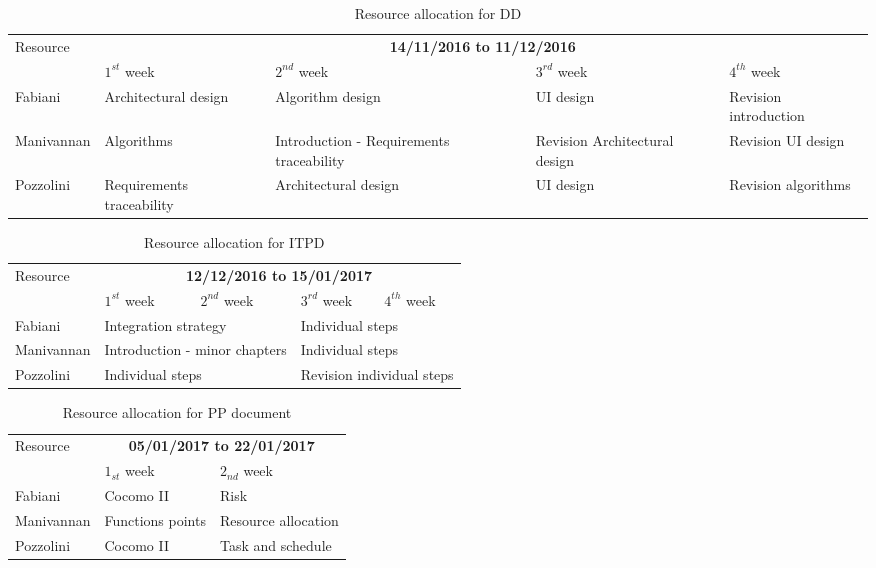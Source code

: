 \begin{table}[H]
		\begin{tabular}{|l|p{2.35cm}|p{2.35cm}|p{2.35cm}|p{2.35cm}|}
			\hline
			\multirow{2}{*}{Resource} & \multicolumn{4}{c|}{\textbf{14/11/2016 to 11/12/2016}} \\
			\cline{2-5}
			& $1^{st}$ week & $2^{nd}$ week & $3^{rd} $ week & $4^{th}$ week \\
			\hline
			Fabiani & Architectural design & Algorithm design & UI design & Revision introduction \\
			Manivannan & Algorithms & Introduction - Requirements traceability & Revision Architectural design & Revision UI design \\
			Pozzolini & Requirements traceability & Architectural design & UI design & Revision algorithms \\
			\hline
		\end{tabular}
	\caption{Resource allocation for DD}
	\label{tab:dd-alloc}
\end{table}

\begin{table}[H]
	\centering
	\begin{tabular}{|l|p{2.35cm}|p{2.35cm}|p{2.35cm}|p{2.35cm}|}
		\hline
		\multirow{2}{*}{Resource} & \multicolumn{4}{c|}{\textbf{12/12/2016 to 15/01/2017}} \\
		\cline{2-5}
		& $1^{st}$ week & $2^{nd}$ week & $3^{rd} $ week & $4^{th}$ week \\
		\hline
		Fabiani & \multicolumn{2}{l|}{Integration strategy} & \multicolumn{2}{l|}{Individual steps} \\
		Manivannan & \multicolumn{2}{l|}{Introduction - minor chapters} & \multicolumn{2}{l|}{Individual steps} \\
		Pozzolini & \multicolumn{2}{l|}{Individual steps} & \multicolumn{2}{l|}{Revision individual steps} \\
		\hline
	\end{tabular}
	\caption{Resource allocation for ITPD}
	\label{tab:itpd-alloc}
\end{table}

\begin{table}[H]
	\centering
	\begin{tabular}{|l|l|l|}
		\hline
		\multirow{2}{*}{Resource} & \multicolumn{2}{c|}{\textbf{05/01/2017 to 22/01/2017}} \\
		\cline{2-3}
		& $1_{st}$ week & $2_{nd}$ week \\
		\hline
		Fabiani & Cocomo II    & Risk      \\
		Manivannan & Functions points     & Resource allocation    \\
		Pozzolini & Cocomo II    & Task and schedule    \\
		\hline
	\end{tabular}
	\caption{Resource allocation for PP document}
	\label{tab:planning-alloc}
\end{table}

